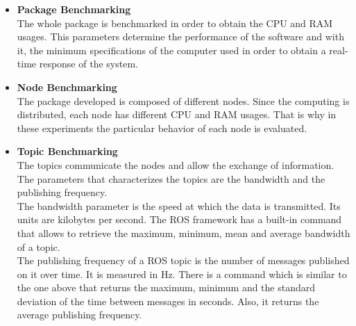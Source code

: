 	\begin{itemize}
		\item{\textbf{Package Benchmarking}}
		\\
		The whole package is benchmarked in order to obtain the CPU and RAM usages. 
		This parameters determine the performance of the software and with it, the minimum specifications of the computer used in order to obtain a real-time response of the system.  
		\\[0.5cm]

		\item{\textbf{Node Benchmarking}}
		\\
		The package developed is composed of different nodes. 
		Since the computing is distributed, each node has different CPU and RAM usages.
		That is why in these experiments the particular behavior of each node is evaluated. 
		\\[0.5cm]

		\item{\textbf{Topic Benchmarking}}\\
		The topics communicate the nodes and allow the exchange of information. 
		The parameters that characterizes the topics are the bandwidth and the publishing frequency.
		\\

		The bandwidth parameter is the speed at which the data is transmitted. 
		Its units are kilobytes per second. 
		The ROS framework has a built-in command that allows to retrieve the maximum, minimum, mean and average bandwidth of a topic. 
		\\

		The publishing frequency of a ROS topic is the number of messages published on it over time. 
		It is measured in Hz. 
		There is a command which is similar to the one above that returns the maximum, minimum and the standard deviation of the time between messages in seconds. 
		Also, it returns the average publishing frequency.  
			\end{itemize}

